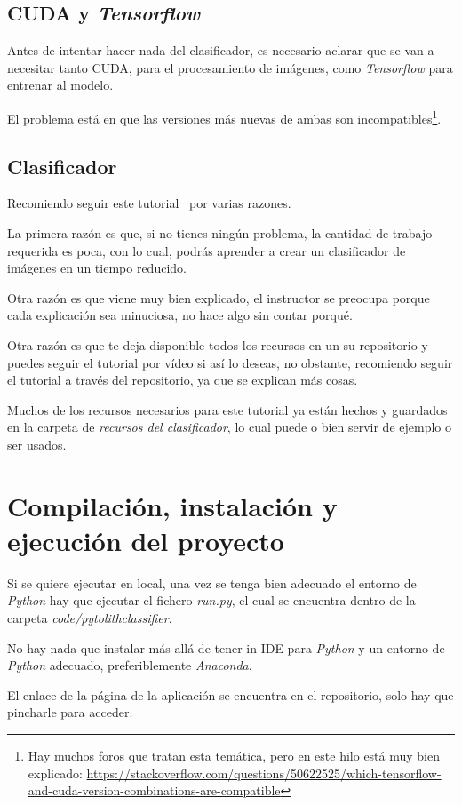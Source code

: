 \subsection{CUDA y \textit{Tensorflow}}
Antes de intentar hacer nada del clasificador, es necesario aclarar que se van a necesitar tanto CUDA, para el procesamiento de imágenes, como \textit{Tensorflow} para entrenar al modelo.

El problema está en que las versiones más nuevas de ambas son incompatibles\footnote{Hay muchos foros que tratan esta temática, pero en este hilo está muy bien explicado: \url{https://stackoverflow.com/questions/50622525/which-tensorflow-and-cuda-version-combinations-are-compatible}}.

\subsection{Clasificador}
Recomiendo seguir este tutorial~\cite{git} por varias razones.

La primera razón es que, si no tienes ningún problema, la cantidad de trabajo requerida es poca, con lo cual, podrás aprender a crear un clasificador de imágenes en un tiempo reducido.

Otra razón es que viene muy bien explicado, el instructor se preocupa porque cada explicación sea minuciosa, no hace algo sin contar porqué.

Otra razón es que te deja disponible todos los recursos en un su repositorio y puedes seguir el tutorial por vídeo si así lo deseas, no obstante, recomiendo seguir el tutorial a través del repositorio, ya que se explican más cosas.

Muchos de los recursos necesarios para este tutorial ya están hechos y guardados en la carpeta de \textit{recursos del clasificador}, lo cual puede o bien servir de ejemplo o ser usados.
\section{Compilación, instalación y ejecución del proyecto}
Si se quiere ejecutar en local, una vez se tenga bien adecuado el entorno de \textit{Python} hay que ejecutar el fichero \textit{run.py}, el cual se encuentra dentro de la carpeta \textit{code/pytolithclassifier}.

No hay nada que instalar más allá de tener in IDE para \textit{Python} y un entorno de \textit{Python} adecuado, preferiblemente \textit{Anaconda}.

El enlace de la página de la aplicación se encuentra en el repositorio, solo hay que pincharle para acceder.

